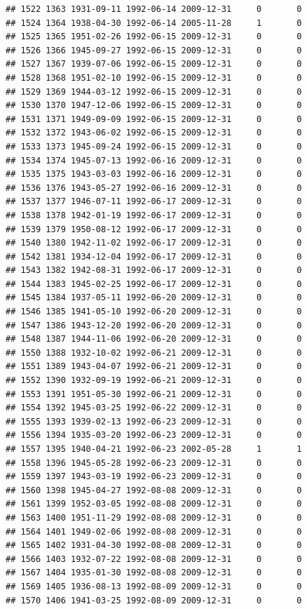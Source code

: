 \documentclass[
]{book}
\theoremstyle{definition}
\theoremstyle{definition}
\theoremstyle{definition}
\theoremstyle{definition}
\theoremstyle{remark}
\begin{document}
\begin{verbatim}
## 1522 1363 1931-09-11 1992-06-14 2009-12-31     0       0
## 1524 1364 1938-04-30 1992-06-14 2005-11-28     1       0
## 1525 1365 1951-02-26 1992-06-15 2009-12-31     0       0
## 1526 1366 1945-09-27 1992-06-15 2009-12-31     0       0
## 1527 1367 1939-07-06 1992-06-15 2009-12-31     0       0
## 1528 1368 1951-02-10 1992-06-15 2009-12-31     0       0
## 1529 1369 1944-03-12 1992-06-15 2009-12-31     0       0
## 1530 1370 1947-12-06 1992-06-15 2009-12-31     0       0
## 1531 1371 1949-09-09 1992-06-15 2009-12-31     0       0
## 1532 1372 1943-06-02 1992-06-15 2009-12-31     0       0
## 1533 1373 1945-09-24 1992-06-15 2009-12-31     0       0
## 1534 1374 1945-07-13 1992-06-16 2009-12-31     0       0
## 1535 1375 1943-03-03 1992-06-16 2009-12-31     0       0
## 1536 1376 1943-05-27 1992-06-16 2009-12-31     0       0
## 1537 1377 1946-07-11 1992-06-17 2009-12-31     0       0
## 1538 1378 1942-01-19 1992-06-17 2009-12-31     0       0
## 1539 1379 1950-08-12 1992-06-17 2009-12-31     0       0
## 1540 1380 1942-11-02 1992-06-17 2009-12-31     0       0
## 1542 1381 1934-12-04 1992-06-17 2009-12-31     0       0
## 1543 1382 1942-08-31 1992-06-17 2009-12-31     0       0
## 1544 1383 1945-02-25 1992-06-17 2009-12-31     0       0
## 1545 1384 1937-05-11 1992-06-20 2009-12-31     0       0
## 1546 1385 1941-05-10 1992-06-20 2009-12-31     0       0
## 1547 1386 1943-12-20 1992-06-20 2009-12-31     0       0
## 1548 1387 1944-11-06 1992-06-20 2009-12-31     0       0
## 1550 1388 1932-10-02 1992-06-21 2009-12-31     0       0
## 1551 1389 1943-04-07 1992-06-21 2009-12-31     0       0
## 1552 1390 1932-09-19 1992-06-21 2009-12-31     0       0
## 1553 1391 1951-05-30 1992-06-21 2009-12-31     0       0
## 1554 1392 1945-03-25 1992-06-22 2009-12-31     0       0
## 1555 1393 1939-02-13 1992-06-23 2009-12-31     0       0
## 1556 1394 1935-03-20 1992-06-23 2009-12-31     0       0
## 1557 1395 1940-04-21 1992-06-23 2002-05-28     1       1
## 1558 1396 1945-05-28 1992-06-23 2009-12-31     0       0
## 1559 1397 1943-03-19 1992-06-23 2009-12-31     0       0
## 1560 1398 1945-04-27 1992-08-08 2009-12-31     0       0
## 1561 1399 1952-03-05 1992-08-08 2009-12-31     0       0
## 1563 1400 1951-11-29 1992-08-08 2009-12-31     0       0
## 1564 1401 1949-02-06 1992-08-08 2009-12-31     0       0
## 1565 1402 1931-04-30 1992-08-08 2009-12-31     0       0
## 1566 1403 1932-07-22 1992-08-08 2009-12-31     0       0
## 1567 1404 1935-01-30 1992-08-08 2009-12-31     0       0
## 1569 1405 1936-08-13 1992-08-09 2009-12-31     0       0
## 1570 1406 1941-03-25 1992-08-09 2009-12-31     0       0

\end{verbatim}
\end{document}
